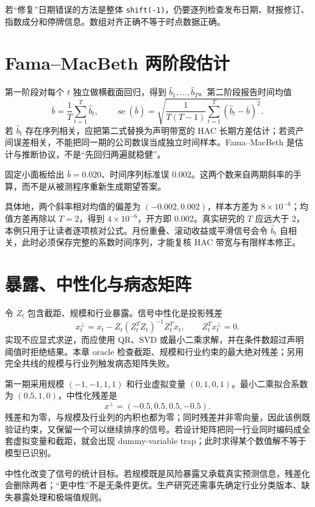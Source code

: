 \begin{diagnostic}
若“修复”日期错误的方法是整体 \texttt{shift(-1)}，仍要逐列检查发布日期、财报修订、指数成分和停牌信息。数组对齐正确不等于时点数据正确。
\end{diagnostic}

\section{Fama--MacBeth 两阶段估计}

第一阶段对每个 $t$ 独立做横截面回归，得到 $\hat b_1,\ldots,\hat b_T$。第二阶段报告时间均值
\[
 \bar b=\frac1T\sum_{t=1}^T\hat b_t,
 \qquad
 \operatorname{se}(\bar b)
 =\sqrt{\frac{1}{T(T-1)}\sum_{t=1}^T(\hat b_t-\bar b)^2}.
\]
若 $\hat b_t$ 存在序列相关，应把第二式替换为声明带宽的 HAC 长期方差估计；若资产间误差相关，不能把同一期的公司数误当成独立时间样本。Fama--MacBeth 是估计与推断协议，不是“先回归两遍就稳健”\cite{fama1973risk}。

固定小面板给出 $\bar b=0.020$、时间序列标准误 $0.002$。这两个数来自两期斜率的手算，而不是从被测程序重新生成期望答案。

具体地，两个斜率相对均值的偏差为 $(-0.002,0.002)$，样本方差为 $8\times10^{-6}$；均值方差再除以 $T=2$，得到 $4\times10^{-6}$，开方即 $0.002$。真实研究的 $T$ 应远大于 2，本例只用于让读者逐项核对公式。月份重叠、滚动收益或平滑信号会令 $\hat b_t$ 自相关，此时必须保存完整的系数时间序列，才能复核 HAC 带宽与有限样本修正。

\section{暴露、中性化与病态矩阵}

令 $Z_t$ 包含截距、规模和行业暴露。信号中性化是投影残差
\[
 x_t^{\perp}=x_t-Z_t(Z_t^TZ_t)^{-1}Z_t^Tx_t,
 \qquad Z_t^Tx_t^{\perp}=0.
\]
实现不应显式求逆，而应使用 QR、SVD 或最小二乘求解，并在条件数超过声明阈值时拒绝结果。本章 oracle 检查截距、规模和行业约束的最大绝对残差；另用完全共线的规模与行业列触发病态矩阵失败。

第一期采用规模 $(-1,-1,1,1)$ 和行业虚拟变量 $(0,1,0,1)$。最小二乘拟合系数为 $(0.5,1,0)$，中性化残差是
\[
 x^\perp=(-0.5,0.5,0.5,-0.5).
\]
残差和为零，与规模及行业列的内积也都为零；同时残差并非零向量，因此该例既验证约束，又保留一个可以继续排序的信号。若设计矩阵把同一行业同时编码成全套虚拟变量和截距，就会出现 dummy-variable trap；此时求得某个数值解不等于模型已识别。

中性化改变了信号的统计目标。若规模既是风险暴露又承载真实预测信息，残差化会删除两者；“更中性”不是无条件更优。生产研究还需事先确定行业分类版本、缺失暴露处理和极端值规则。

